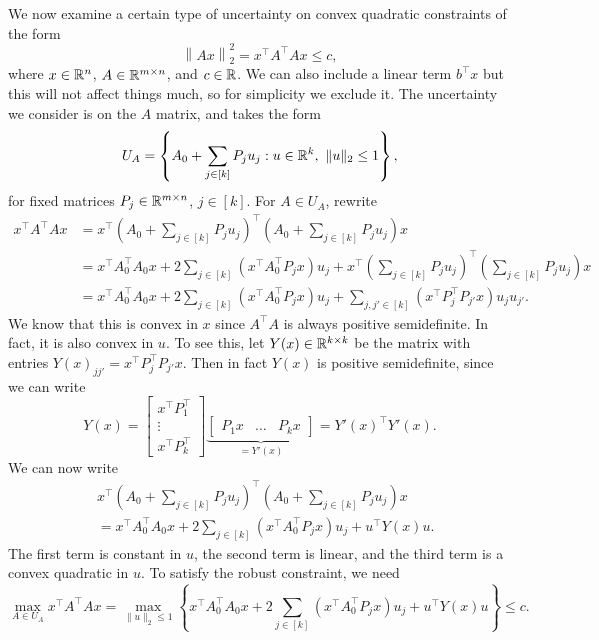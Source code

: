 \documentclass[11pt,oneside]{article}
\theoremstyle{plain}
\theoremstyle{definition}
\theoremstyle{remark}
\begin{document}
We now examine a certain type of uncertainty on convex quadratic constraints of the form
\[ \left\| Ax \right\|_2^2 = x^\top A^\top A x \leq c, \]
where $x \in \mathbb{R}^n$, $A \in \mathbb{R}^{m \times n}$, and $c \in \mathbb{R}$. We can also include a linear term $b^\top x$ but this will not affect things much, so for simplicity we exclude it. The uncertainty we consider is on the $A$ matrix, and takes the form
\[ U_A = \left\{ A_0 + \sum_{j \in [k]} P_j u_j : u \in \mathbb{R}^k,\ \|u\|_2 \leq 1 \right\}, \]
for fixed matrices $P_j \in \mathbb{R}^{m \times n}$, $j \in [k]$. For $A \in U_A$, rewrite
\begin{align*}
x^\top A^\top A x &= x^\top \left( A_0 + \sum_{j \in [k]} P_j u_j \right)^\top \left( A_0 + \sum_{j \in [k]} P_j u_j \right) x\\
&= x^\top A_0^\top A_0 x + 2 \sum_{j \in [k]} (x^\top A_0^\top P_j x) u_j + x^\top \left( \sum_{j \in [k]} P_j u_j \right)^\top \left( \sum_{j \in [k]} P_j u_j \right) x\\
&= x^\top A_0^\top A_0 x + 2 \sum_{j \in [k]} (x^\top A_0^\top P_j x) u_j + \sum_{j,j' \in [k]} \left(x^\top P_j^\top P_{j'} x\right) u_j u_{j'}.
\end{align*}
We know that this is convex in $x$ since $A^\top A$ is always positive semidefinite. In fact, it is also convex in $u$. To see this, let $Y(x) \in \mathbb{R}^{k \times k}$ be the matrix with entries $Y(x)_{jj'} = x^\top P_j^\top P_{j'} x$. Then in fact $Y(x)$ is positive semidefinite, since we can write
\[ Y(x) = \begin{bmatrix}
x^\top P_1^\top\\
\vdots\\
x^\top P_k^\top
\end{bmatrix}
\underbrace{\begin{bmatrix}
P_1 x & \ldots & P_k x
\end{bmatrix}}_{=Y'(x)} = Y'(x)^\top Y'(x).\]
We can now write
\begin{align*}
&x^\top \left( A_0 + \sum_{j \in [k]} P_j u_j \right)^\top \left( A_0 + \sum_{j \in [k]} P_j u_j \right) x\\
&= x^\top A_0^\top A_0 x + 2 \sum_{j \in [k]} (x^\top A_0^\top P_j x) u_j + u^\top Y(x) u.
\end{align*}
The first term is constant in $u$, the second term is linear, and the third term is a convex quadratic in $u$. To satisfy the robust constraint, we need
\[ \max_{A \in U_A} x^\top A^\top A x = \max_{\|u\|_2 \leq 1} \left\{ x^\top A_0^\top A_0 x + 2 \sum_{j \in [k]} (x^\top A_0^\top P_j x) u_j + u^\top Y(x) u \right\} \leq c. \]
\end{document}

